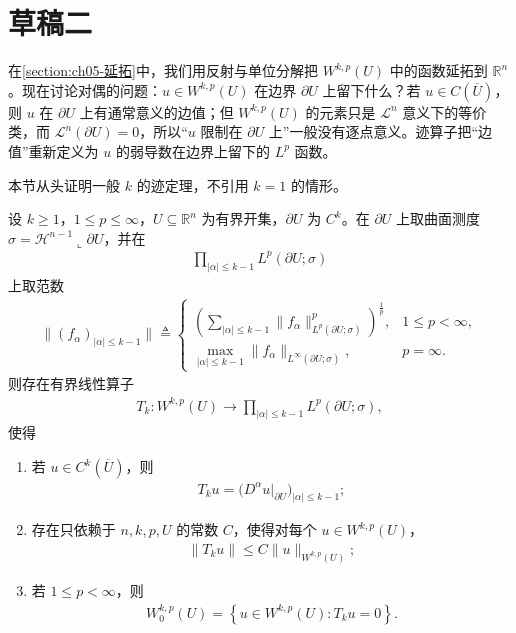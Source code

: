 \documentclass[../../main.tex]{subfiles}%
\begin{document}
\section{草稿二}

在\cref{section:ch05-延拓}中，我们用反射与单位分解把 $W^{k,p}(U)$ 中的函数延拓到 $\mathbb{R}^{n}$。现在讨论对偶的问题：$u\in W^{k,p}(U)$ 在边界 $\partial U$ 上留下什么？若 $u\in C(\overline{U})$，则 $u$ 在 $\partial U$ 上有通常意义的边值；但 $W^{k,p}(U)$ 的元素只是 $\mathcal{L}^{n}$ 意义下的等价类，而 $\mathcal{L}^{n}(\partial U)=0$，所以“$u$ 限制在 $\partial U$ 上”一般没有逐点意义。迹算子把“边值”重新定义为 $u$ 的弱导数在边界上留下的 $L^{p}$ 函数。

本节从头证明一般 $k$ 的迹定理，不引用 $k=1$ 的情形。

\begin{theorem}[$W^{k,p}$ 的迹与零迹刻画]\label{theorem:ch05-零迹函数-一般}
设 $k\geqslant1$，$1\leqslant p\leqslant\infty$，$U\subseteq\mathbb{R}^{n}$ 为有界开集，$\partial U$ 为 $C^{k}$。在 $\partial U$ 上取曲面测度 $\sigma=\mathcal{H}^{n-1}\llcorner\partial U$，并在
\begin{align*}
\prod_{|\alpha|\leqslant k-1}L^{p}(\partial U;\sigma)
\end{align*}
上取范数
\begin{align*}
\|(f_{\alpha})_{|\alpha|\leqslant k-1}\|
\triangleq
\begin{cases}
\left(\sum_{|\alpha|\leqslant k-1}\|f_{\alpha}\|_{L^{p}(\partial U;\sigma)}^{p}\right)^{\frac{1}{p}}, & 1\leqslant p<\infty,\\[2mm]
\max_{|\alpha|\leqslant k-1}\|f_{\alpha}\|_{L^{\infty}(\partial U;\sigma)}, & p=\infty.
\end{cases}
\end{align*}
则存在有界线性算子
\begin{align*}
T_{k}:W^{k,p}(U)\longrightarrow
\prod_{|\alpha|\leqslant k-1}L^{p}(\partial U;\sigma),
\end{align*}
使得
\begin{enumerate}[(1)]
\item 若 $u\in C^{k}(\overline{U})$，则
\begin{align*}
T_{k}u=\bigl(D^{\alpha}u|_{\partial U}\bigr)_{|\alpha|\leqslant k-1};
\end{align*}
\item 存在只依赖于 $n,k,p,U$ 的常数 $C$，使得对每个 $u\in W^{k,p}(U)$，
\begin{align}
\|T_{k}u\|
\leqslant
C\|u\|_{W^{k,p}(U)};
\label{eq:ch05-一般零迹-迹估计}
\end{align}
\item 若 $1\leqslant p<\infty$，则
\begin{align}
W^{k,p}_{0}(U)
=
\left\{
u\in W^{k,p}(U):T_{k}u=0
\right\}.
\label{eq:ch05-一般零迹-核}
\end{align}
\end{enumerate}
\end{theorem}
\end{document}
